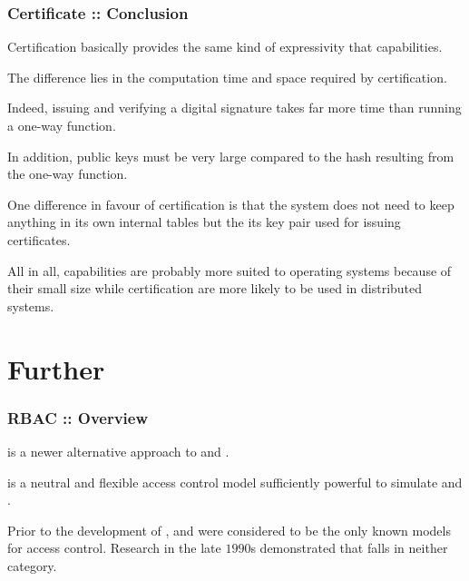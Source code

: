 
\begin{frame}
  \frametitle{Certificate :: Conclusion}

  Certification basically provides the same kind of expressivity that
  capabilities.

  \-

  The difference lies in the computation time and space required by
  certification.

  \-

  Indeed, issuing and verifying a digital signature takes far more time
  than running a one-way function.

  \-

  In addition, public keys must be very large compared to the hash resulting
  from the one-way function.

  \-

  One difference in favour of certification is that the system does not
  need to keep anything in its own internal tables but the its key pair used
  for issuing certificates.

  \-

  All in all, capabilities are probably more suited to operating systems
  because of their small size while certification are more likely to be used
  in distributed systems.
\end{frame}

%
%

\section{Further}


\begin{frame}
  \frametitle{RBAC :: Overview}

   is a newer alternative
  approach to  and .

  \-

   is a neutral and flexible access control model sufficiently
  powerful to simulate  and .

  \-

  Prior to the development of ,  and  were
  considered to be the only known models for access control. Research in the
  late $1990$s demonstrated that  falls in neither category.
\end{frame}

